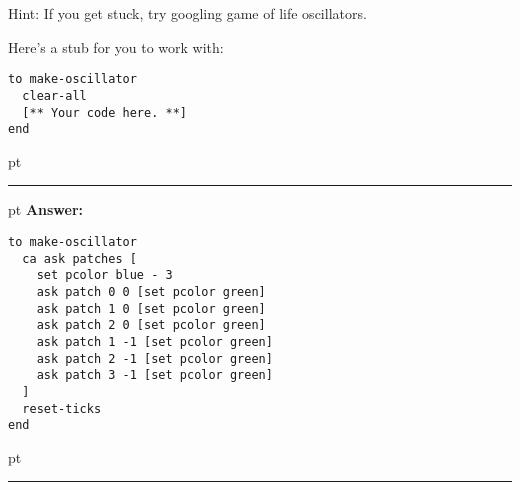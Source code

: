 \documentclass[11pt]{book}
\begin{document}
\begin{enumerate}
Hint: If you get stuck, try googling game of life oscillators.

Here's a stub for you to work with:
\begin{verbatim}
to make-oscillator
  clear-all
  [** Your code here. **]
end
\end{verbatim}

\ifnum{}
 pt
\hrule
{} pt
{\bf Answer: }
\begin{verbatim}
to make-oscillator
  ca ask patches [
    set pcolor blue - 3
    ask patch 0 0 [set pcolor green]
    ask patch 1 0 [set pcolor green]
    ask patch 2 0 [set pcolor green]
    ask patch 1 -1 [set pcolor green]
    ask patch 2 -1 [set pcolor green]
    ask patch 3 -1 [set pcolor green]
  ]
  reset-ticks
end
\end{verbatim}
 pt
\hrule
\fi

\end{enumerate}
\end{document}
